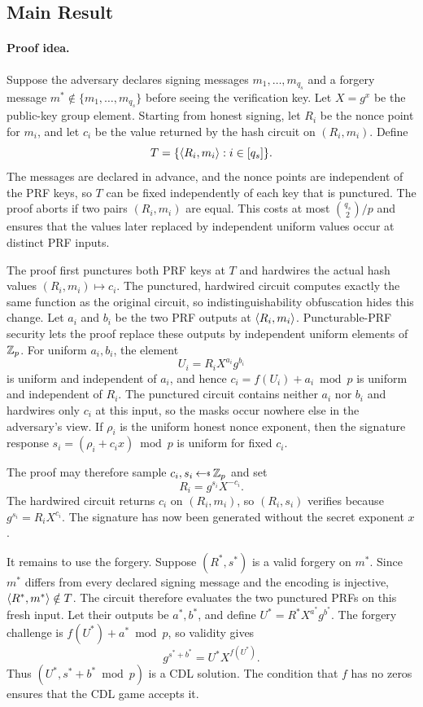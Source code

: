 \subsection{Main Result} \label{sec-io-thm}

\paragraph*{Proof idea.}
Suppose the adversary declares signing messages $m_1,\ldots,m_{q_s}$ and a forgery message $m^*\notin\{m_1,\ldots,m_{q_s}\}$ before seeing the verification key. Let $X=g^x$ be the public-key group element. Starting from honest signing, let $R_i$ be the nonce point for $m_i$, and let $c_i$ be the value returned by the hash circuit on $(R_i,m_i)$. Define
$$
T=\{\langle R_i,m_i \rangle:i\in[q_s]\}.
$$
The messages are declared in advance, and the nonce points are independent of the PRF keys, so $T$ can be fixed independently of each key that is punctured. The proof aborts if two pairs $(R_i,m_i)$ are equal. This costs at most $\binom{q_s}{2}/p$ and ensures that the values later replaced by independent uniform values occur at distinct PRF inputs.

The proof first punctures both PRF keys at $T$ and hardwires the actual hash values $(R_i,m_i)\mapsto c_i$. The punctured, hardwired circuit computes exactly the same function as the original circuit, so indistinguishability obfuscation hides this change. Let $a_i$ and $b_i$ be the two PRF outputs at $\langle R_i,m_i \rangle$. Puncturable-PRF security lets the proof replace these outputs by independent uniform elements of $\mathbb Z_p$. For uniform $a_i,b_i$, the element
$$
U_i=R_iX^{a_i}g^{b_i}
$$
is uniform and independent of $a_i$, and hence $c_i=f(U_i)+a_i\bmod p$ is uniform and independent of $R_i$. The punctured circuit contains neither $a_i$ nor $b_i$ and hardwires only $c_i$ at this input, so the masks occur nowhere else in the adversary's view. If $\rho_i$ is the uniform honest nonce exponent, then the signature response $s_i=(\rho_i+c_ix)\bmod p$ is uniform for fixed $c_i$.

\begin{samepage}
The proof may therefore sample $c_i,s_i\getsr\Zp$ and set
$$
R_i=g^{s_i}X^{-c_i}.
$$
The hardwired circuit returns $c_i$ on $(R_i,m_i)$, so $(R_i,s_i)$ verifies because $g^{s_i}=R_iX^{c_i}$. The signature has now been generated without the secret exponent $x$.
\end{samepage}

It remains to use the forgery. Suppose $(R^*,s^*)$ is a valid forgery on $m^*$. Since $m^*$ differs from every declared signing message and the encoding is injective, $\langle R^*,m^* \rangle\notin T$. The circuit therefore evaluates the two punctured PRFs on this fresh input. Let their outputs be $a^*,b^*$, and define $U^*=R^*X^{a^*}g^{b^*}$. The forgery challenge is $f(U^*)+a^*\bmod p$, so validity gives
$$
g^{s^*+b^*}=U^*X^{f(U^*)}.
$$
Thus $(U^*,s^*+b^*\bmod p)$ is a CDL solution. The condition that $f$ has no zeros ensures that the CDL game accepts it.

